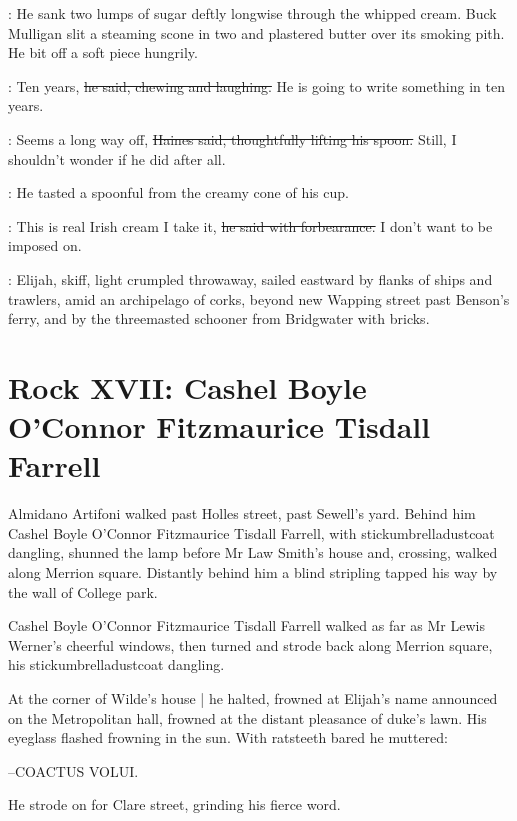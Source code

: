 :
He sank two lumps of sugar deftly longwise
through the whipped cream.
Buck Mulligan slit a steaming scone in two
and plastered butter
over its smoking pith.
He bit off a soft piece hungrily.

\mulligan:
Ten years,
\sout{he said,
chewing and laughing.}
He is going to write something in ten years.%

\haines:
Seems a long way off,
\sout{Haines said,
thoughtfully lifting his spoon.}
Still, I shouldn't wonder if he did after all.

:
He tasted a spoonful from the creamy cone of his cup.

\haines:
This is real Irish cream I take it,
\sout{he said with forbearance.}
I don't want to be imposed on.

\begin{mdframed}
    :
    Elijah,
    skiff,
    light crumpled throwaway,
    sailed eastward by flanks of
    ships and trawlers,
    amid an archipelago of corks,
    beyond new Wapping street
    past Benson's ferry,
    and by the threemasted schooner  from
    Bridgwater with bricks.
\end{mdframed}


\section*{Rock XVII: Cashel Boyle O'Connor Fitzmaurice Tisdall Farrell}


Almidano Artifoni walked past Holles street,
past Sewell's yard.
Behind him
Cashel Boyle O'Connor Fitzmaurice Tisdall Farrell,
with stickumbrelladustcoat dangling,
shunned the lamp before Mr Law Smith's house
and, crossing, walked along Merrion square.
Distantly behind him a blind stripling
tapped his way by the wall of College park.

Cashel Boyle O'Connor Fitzmaurice Tisdall Farrell
walked as far as
Mr Lewis Werner's cheerful windows,
then turned and strode back along Merrion square,
his stickumbrelladustcoat dangling.

At the corner of Wilde's house |
he halted,
frowned at Elijah's name announced on the Metropolitan hall,
frowned at the distant pleasance of duke's lawn.
His eyeglass flashed frowning in the sun.
With ratsteeth bared he muttered:

--COACTUS VOLUI.

He strode on for Clare street,
grinding his fierce word.


